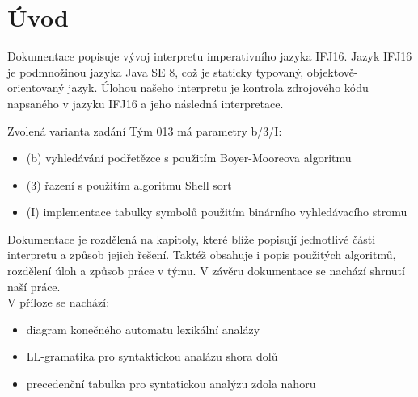 \documentclass[a4paper, 11pt]{article}
\begin{document}
    \section{Úvod}
    \par
    Dokumentace popisuje vývoj interpretu imperativního jazyka IFJ16. Jazyk IFJ16 je podmnožinou jazyka Java SE 8, což je staticky typovaný, objektově-orientovaný jazyk.
    Úlohou našeho interpretu je kontrola zdrojového kódu napsaného v jazyku IFJ16 a jeho následná interpretace.\par
    Zvolená varianta zadání Tým 013 má parametry b/3/I:
    \begin{itemize}[itemsep=1mm]
        \item(b) vyhledávání podřetězce s použitím Boyer-Mooreova algoritmu
        \item(3) řazení s použitím algoritmu Shell sort
        \item(I) implementace tabulky symbolů použitím binárního vyhledávacího stromu
    \end{itemize}
    Dokumentace je rozdělená na kapitoly, které blíže popisují jednotlivé části interpretu a způsob jejich řešení. Taktéž obsahuje i popis použitých algoritmů, rozdělení úloh a způsob práce v týmu. V závěru dokumentace se nachází shrnutí naší práce.\\
    V příloze se nachází:
    \begin{itemize}[itemsep=1mm]
        \item diagram konečného automatu lexikální analázy
        \item LL-gramatika pro syntaktickou analázu shora dolů
        \item precedenční tabulka pro syntatickou analýzu zdola nahoru
    \end{itemize}
    
\end{document}

